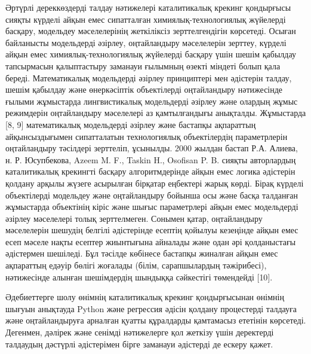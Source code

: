 Әртүрлі дереккөздерді талдау нәтижелері каталитикалық крекинг қондырғысы
сияқты күрделі айқын емес сипатталған химиялық-технологиялық жүйелерді
басқару, модельдеу мәселелерінің жеткіліксіз зерттелгендігін көрсетеді.
Осыған байланысты модельдерді әзірлеу, оңтайландыру мәселелерін зерттеу,
күрделі айқын емес химиялық-технологиялық жүйелерді басқару үшін шешім
қабылдау тапсырмасын қалыптастыру заманауи ғылымның өзекті міндеті болып
қала береді. Математикалық модельдерді әзірлеу принциптері мен әдістерін
талдау, шешім қабылдау және өнеркәсіптік объектілерді оңтайландыру
нәтижесінде ғылыми жұмыстарда лингвистикалық модельдерді әзірлеу және
олардың жұмыс режимдерін оңтайландыру мәселелері аз қамтылғандығы
анықталды. Жұмыстарда {[}8, 9{]} математикалық модельдерді әзірлеу және
бастапқы ақпараттың айқынсыздығымен сипатталатын технологиялық
объектілердің параметрлерін оңтайландыру тәсілдері зерттеліп, ұсынылды.
2000 жылдан бастап Р.А. Алиева, н. Р. Юсупбекова, Azeem M. F., Taskin
H., Osofisan P. B. сияқты авторлардың каталитикалық крекингті басқару
алгоритмдерінде айқын емес логика әдістерін қолдану арқылы жүзеге
асырылған бірқатар еңбектері жарық көрді. Бірақ күрделі объектілерді
модельдеу және оңтайландыру бойынша осы және басқа талданған жұмыстарда
объектінің кіріс және шығыс параметрлері айқын емес модельдерді әзірлеу
мәселелері толық зерттелмеген. Сонымен қатар, оңтайландыру мәселелерін
шешудің белгілі әдістерінде есептің қойылуы кезеңінде айқын емес есеп
мәселе нақты есептер жиынтығына айналады және одан әрі қолданыстағы
әдістермен шешіледі. Бұл тәсілде көбінесе бастапқы жиналған айқын емес
ақпараттың едәуір бөлігі жоғалады (білім, сарапшылардың тәжірибесі),
нәтижесінде алынған шешімдердің шындыққа сәйкестігі төмендейді {[}10{]}.

Әдебиеттерге шолу өнімнің каталитикалық крекинг қондырғысынан өнімнің
шығуын анықтауда Python және регрессия әдісін қолдану процестерді
талдауға және оңтайландыруға арналған қуатты құралдарды қамтамасыз
ететінін көрсетеді. Дегенмен, дәлірек және сенімді нәтижелерге қол
жеткізу үшін деректерді талдаудың дәстүрлі әдістерімен бірге заманауи
әдістерді де ескеру қажет.

